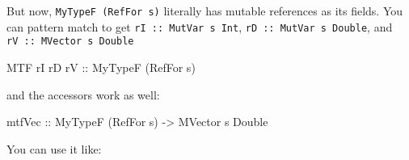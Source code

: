 \documentclass[]{article}
\newenvironment{Shaded}{}{}
\newcommand{\CommentTok}[1]{\textcolor[rgb]{0.38,0.63,0.69}{\textit{#1}}}
\newcommand{\DataTypeTok}[1]{\textcolor[rgb]{0.56,0.13,0.00}{#1}}
\newcommand{\DecValTok}[1]{\textcolor[rgb]{0.25,0.63,0.44}{#1}}
\newcommand{\FloatTok}[1]{\textcolor[rgb]{0.25,0.63,0.44}{#1}}
\newcommand{\KeywordTok}[1]{\textcolor[rgb]{0.00,0.44,0.13}{\textbf{#1}}}
\newcommand{\NormalTok}[1]{#1}
\newcommand{\OperatorTok}[1]{\textcolor[rgb]{0.40,0.40,0.40}{#1}}
\newcommand{\OtherTok}[1]{\textcolor[rgb]{0.00,0.44,0.13}{#1}}
\begin{document}
But now, \texttt{MyTypeF\ (RefFor\ s)} literally has mutable references as its
fields. You can pattern match to get \texttt{rI\ ::\ MutVar\ s\ Int},
\texttt{rD\ ::\ MutVar\ s\ Double}, and \texttt{rV\ ::\ MVector\ s\ Double}

\begin{Shaded}
\begin{Highlighting}[]
\DataTypeTok{MTF}\NormalTok{ rI rD}\OtherTok{ rV ::} \DataTypeTok{MyTypeF}\NormalTok{ (}\DataTypeTok{RefFor}\NormalTok{ s)}
\end{Highlighting}
\end{Shaded}

and the accessors work as well:

\begin{Shaded}
\begin{Highlighting}[]
\NormalTok{mtfVec}
\OtherTok{    ::} \DataTypeTok{MyTypeF}\NormalTok{ (}\DataTypeTok{RefFor}\NormalTok{ s)}
    \OtherTok{{-}\textgreater{}} \DataTypeTok{MVector}\NormalTok{ s }\DataTypeTok{Double}
\end{Highlighting}
\end{Shaded}

You can use it like:

\begin{Shaded}
\end{Shaded}
\end{document}
